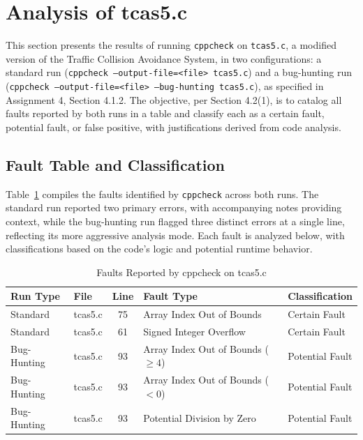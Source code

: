 \documentclass[conference]{IEEEtran}
\begin{document}


\section{Analysis of tcas5.c}
This section presents the results of running \texttt{cppcheck} on \texttt{tcas5.c}, a modified version of the Traffic Collision Avoidance System, in two configurations: a standard run (\texttt{cppcheck --output-file=<file> tcas5.c}) and a bug-hunting run (\texttt{cppcheck --output-file=<file> --bug-hunting tcas5.c}), as specified in Assignment 4, Section 4.1.2. The objective, per Section 4.2(1), is to catalog all faults reported by both runs in a table and classify each as a certain fault, potential fault, or false positive, with justifications derived from code analysis.

\subsection{Fault Table and Classification}
Table~\ref{tab:tcas5_faults} compiles the faults identified by \texttt{cppcheck} across both runs. The standard run reported two primary errors, with accompanying notes providing context, while the bug-hunting run flagged three distinct errors at a single line, reflecting its more aggressive analysis mode. Each fault is analyzed below, with classifications based on the code’s logic and potential runtime behavior.

\begin{table}[p]
    \caption{Faults Reported by cppcheck on tcas5.c}
    \label{tab:tcas5_faults}
    \centering
    \begin{tabular}{llcll}
        \toprule
        Run Type & File & Line & Fault Type & Classification \\
        \midrule
        Standard & tcas5.c & 75 & Array Index Out of Bounds & Certain Fault \\
        Standard & tcas5.c & 61 & Signed Integer Overflow & Certain Fault \\
        Bug-Hunting & tcas5.c & 93 & Array Index Out of Bounds ($\geq 4$) & Potential Fault \\
        Bug-Hunting & tcas5.c & 93 & Array Index Out of Bounds ($< 0$) & Potential Fault \\
        Bug-Hunting & tcas5.c & 93 & Potential Division by Zero & Potential Fault \\
        \bottomrule
    \end{tabular}
\end{table}
\end{document}
